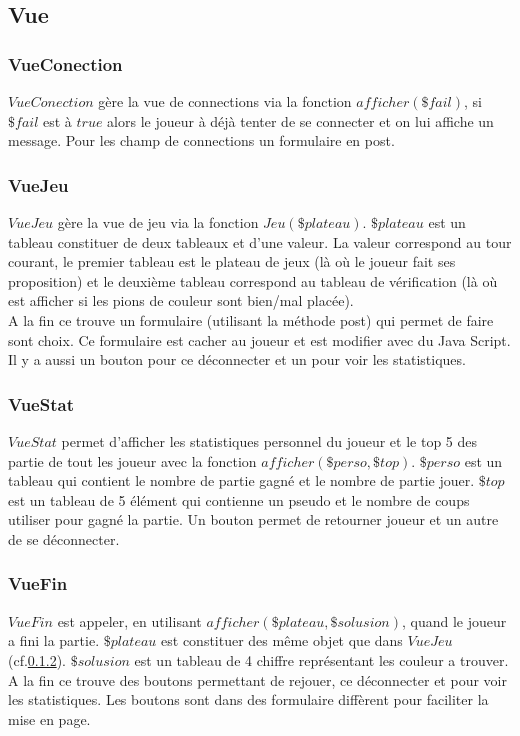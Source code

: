\documentclass{article}
\begin{document}
        
    \subsection{Vue}
        
        \subsubsection{VueConection}
            $VueConection$ gère la vue de connections via la fonction $afficher(\$fail)$, si $\$fail$ est à $true$ alors le joueur à déjà tenter de se connecter et on lui affiche un message. Pour les champ de connections un formulaire en post.
        
        
        \subsubsection{VueJeu}\label{VueJeu}
            $VueJeu$ gère la vue de jeu via la fonction $Jeu(\$plateau)$. $\$plateau$ est un tableau constituer de deux tableaux et d'une valeur. La valeur correspond au tour courant, le premier tableau est le plateau de jeux (là où le joueur fait ses proposition) et le deuxième tableau correspond au tableau de vérification (là où est afficher si les pions de couleur sont bien/mal placée).\\
            A la fin ce trouve un formulaire (utilisant la méthode post) qui permet de faire sont choix. Ce formulaire est cacher au joueur et est modifier avec du Java Script.
            Il y a aussi un bouton pour ce déconnecter et un pour voir les statistiques.
            
        \subsubsection{VueStat}
            $VueStat$ permet d'afficher les statistiques personnel du joueur et le top 5 des partie de tout les joueur avec la fonction $afficher(\$perso,\$top)$. $\$perso$ est un tableau qui contient le nombre de partie gagné et le nombre de partie jouer. $\$top$ est un tableau de 5 élément qui contienne un pseudo et le nombre de coups utiliser pour gagné la partie.
            Un bouton permet de retourner joueur et un autre de se déconnecter.
            
        \subsubsection{VueFin}
            $VueFin$ est appeler, en utilisant $afficher(\$plateau ,\$solusion)$, quand le joueur a fini la partie. $\$plateau$ est constituer des même objet que dans $VueJeu$ (cf.\ref{VueJeu}). $\$solusion$ est un tableau de 4 chiffre représentant les couleur a trouver.\\
            A la fin ce trouve des boutons permettant de rejouer, ce déconnecter et pour voir les statistiques. Les boutons sont dans des formulaire diffèrent pour faciliter la mise en page.
            
\end{document}
